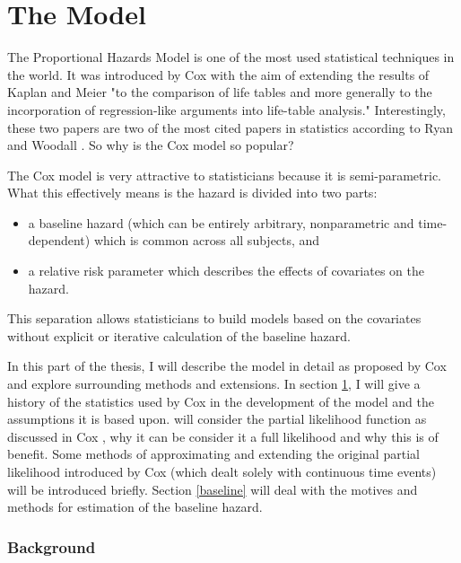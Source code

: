\newpage
\part{The Model}

The Proportional Hazards Model is one of the most used statistical techniques in the world. It was introduced by Cox  with the aim of extending the results of Kaplan and Meier  "to the comparison of life tables and more generally to the incorporation of regression-like arguments into life-table analysis." Interestingly, these two papers are two of the most cited papers in statistics according to Ryan and Woodall . So why is the Cox model so popular?

The Cox model is very attractive to statisticians because it is semi-parametric. What this effectively means is the hazard is divided into two parts:

\begin{itemize}
    \item a baseline hazard (which can be entirely arbitrary, nonparametric and time-dependent) which is common across all subjects, and
    \item a relative risk parameter which describes the effects of covariates on the hazard.
\end{itemize} 

This separation allows statisticians to build models based on the covariates without explicit or iterative calculation of the baseline hazard.

In this part of the thesis, I will describe the model in detail as proposed by Cox and explore surrounding methods and extensions. In section \ref{background}, I will give a history of the statistics used by Cox in the development of the model and the assumptions it is based upon.  will consider the partial likelihood function as discussed in Cox , why it can be consider it a full likelihood and why this is of benefit. Some methods of approximating and extending the original partial likelihood introduced by Cox  (which dealt solely with continuous time events) will be introduced briefly. Section \ref{baseline} will deal with the motives and methods for estimation of the baseline hazard.

\section{Background}\label{background}

